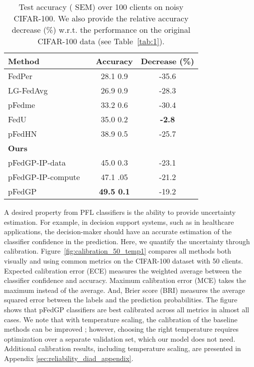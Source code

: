 \documentclass{article}
\def\Figref#1{Figure~\ref{#1}}
\begin{document}
\begin{wraptable}[16]{r}{0.5\linewidth}
\vspace{-13pt}
\setlength{\tabcolsep}{3pt}
\small
\caption{Test accuracy ( SEM) over 100 clients on noisy CIFAR-100. We also provide the relative accuracy decrease (\%) w.r.t. the performance on the original CIFAR-100 data (see Table~\ref{tab:1}).
}
\centering
\begin{tabular}{l c c c} 
    \toprule
    \multicolumn{1}{l}{Method} && \multicolumn{1}{c}{Accuracy} & Decrease (\%) \\
    \midrule
    FedPer \cite{arivazhagan2019federated} && 28.1  0.9 & -35.6 \\
    LG-FedAvg \cite{liang2020think} && 26.9  0.9 & -28.3 \\
    pFedme \cite{t2020personalized} && 33.2  0.6 & -30.4 \\
    FedU  \cite{dinh2021fedu} && 35.0  0.2 & \textbf{-2.8} \\
    pFedHN \cite{shamsian2021personalized_icml} && 38.9  0.5 & -25.7 \\
    \midrule
    \textbf{Ours} &&\\
    pFedGP-IP-data && 45.0  0.3 & -23.1 \\
    pFedGP-IP-compute && 47.1  .05 & -21.2 \\
    pFedGP && \textbf{49.5  0.1} & -19.2 \\
    \bottomrule
\end{tabular}
\label{tab:noisy_cifar}
\end{wraptable}

A desired property from PFL classifiers is the ability to provide uncertainty estimation. For example, in decision support systems, such as in healthcare applications, the decision-maker should have an accurate estimation of the classifier confidence in the prediction.
Here, we quantify the uncertainty through calibration. \Figref{fig:calibration_50_temp1} compares all methods both visually and using common metrics \cite{brier1950verification,guo2017calibration, naeini2015obtaining} on the CIFAR-100 dataset with 50 clients. Expected calibration error (ECE) measures the weighted average between the classifier confidence and accuracy. Maximum calibration error (MCE) takes the maximum instead of the average. And, Brier score (BRI) \cite{brier1950verification} measures the average squared error between the labels and the prediction probabilities. The figure shows that pFedGP classifiers are best calibrated across all metrics in almost all cases. We note that with temperature scaling, the calibration of the baseline methods can be improved \cite{guo2017calibration}; however, choosing the right temperature requires optimization over a separate validation set, which our model does not need. Additional calibration results, including temperature scaling, are presented in Appendix \ref{sec:reliability_diad_appendix}.
\end{document}
